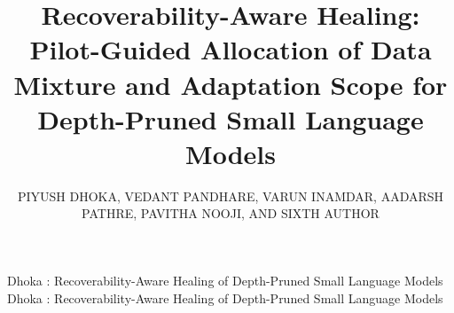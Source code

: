 \documentclass{ieeeaccess}
\begin{document}

\title{Recoverability-Aware Healing: Pilot-Guided Allocation of Data Mixture and Adaptation Scope for Depth-Pruned Small Language Models}

\author{\uppercase{Piyush Dhoka},
\uppercase{Vedant Pandhare},
\uppercase{Varun Inamdar},
\uppercase{Aadarsh Pathre},
\uppercase{Pavitha Nooji},
AND \uppercase{Sixth Author}}

\address[1]{Department, Institution, City, India (e-mail: author1@domain)}
\address[2]{Department, Institution, City, India (e-mail: author2@domain)}
\address[3]{Department, Institution, City, India (e-mail: author3@domain)}
\address[4]{Department, Institution, City, India (e-mail: author4@domain)}
\address[5]{Department, Institution, City, India (e-mail: author5@domain)}
\address[6]{Department, Institution, City, Country (e-mail: author6@domain)}

\markboth
{Dhoka \headeretal: Recoverability-Aware Healing of Depth-Pruned Small Language Models}
{Dhoka \headeretal: Recoverability-Aware Healing of Depth-Pruned Small Language Models}

\end{document}
